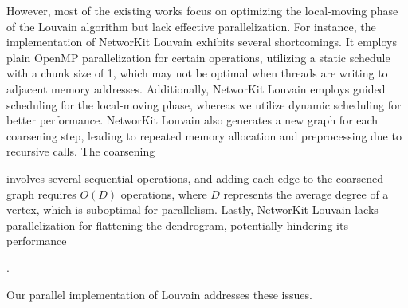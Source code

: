 However, most of the existing works focus on optimizing the local-moving phase of the Louvain algorithm but lack effective parallelization. For instance, the implementation of NetworKit Louvain exhibits several shortcomings. It employs plain OpenMP parallelization for certain operations, utilizing a static schedule with a chunk size of 1, which may not be optimal when threads are writing to adjacent memory addresses. Additionally, NetworKit Louvain employs guided scheduling for the local-moving phase, whereas we utilize dynamic scheduling for better performance. NetworKit Louvain also generates a new graph for each coarsening step, leading to repeated memory allocation and preprocessing due to recursive calls. The coarsening involves several sequential operations, and adding each edge to the coarsened graph requires $O(D)$ operations, where $D$ represents the average degree of a vertex, which is suboptimal for parallelism. Lastly, NetworKit Louvain lacks parallelization for flattening the dendrogram, potentially hindering its performance. Our parallel implementation of Louvain addresses these issues.
